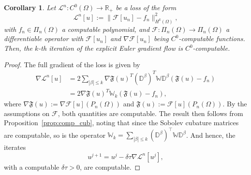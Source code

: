 \documentclass[10pt,a4paper]{amsart}
\newtheorem{corollary}{Corollary}
\begin{document}
\begin{corollary}\label{cor:comp_GF}
    Let $\mathcal{L}^n:C^0(\Omega)\rightarrow \mathbb{R}_+$ be a loss of the form
    \begin{equation}
        \mathcal{L}^n[u]:=\|\mathcal{F}[u_n]-f_n\|_{H^k(\Omega)}^2,
    \end{equation}
    with $f_n\in \Pi_{n}(\Omega)$ a computable polynomial, and $\mathcal{F}:\Pi_{n}(\Omega)\rightarrow \Pi_{n}(\Omega)$ a differentiable operator with $\mathcal{F}[u_n]$ and $\nabla\mathcal{F}[u_n]$ being $C^0$-computable functions. Then, the $k$-th iteration of the explicit Euler gradient flow is $C^0$-computable.  
\end{corollary}

\vspace{-1em}\begin{proof}
    The full gradient of the loss is given by
    \begin{equation}
    \begin{aligned}
        \nabla\mathcal{L}^n[u] &= 2\sum\limits_{|\beta|\leq k}\nabla\mathfrak{F}(u)^T(\mathbb{D^\beta})^T\mathbb{W}\mathbb{D^\beta}(\mathfrak{F}(u)-f_n)\\&
        = 2\nabla\mathfrak{F}(u)^T\mathbb{W}_k(\mathfrak{F}(u)-f_n),
    \end{aligned}
    \end{equation}
    where $\nabla\mathfrak{F}(u):=\nabla\mathcal{F}[u](P_{n}(\Omega))$ and $\mathfrak{F}(u):=\mathcal{F}[u](P_{n}(\Omega))$. By the assumptions on $\mathcal{F}$, both quantities are computable. The result then follows from Proposition~\ref{prop:comp_cub}, noting that since the Sobolev cubature matrices are computable, so is the operator $\mathbb{W}_k = \sum\limits_{|\beta|\leq k}(\mathbb{D}^\beta)^\top \mathbb{W} \mathbb{D}^\beta$. And hence, the iterates 
    $$
   u^{j+1} =u^j-\delta\tau \nabla\mathcal{L}^n[u^{j}],
    $$
    with a computable $\delta\tau>0$, are computable. 
\end{proof}
\end{document}
